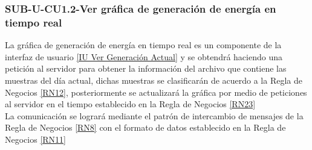 \subsubsection{SUB-U-CU1.2-Ver gráfica de generación de energía en tiempo real}\label{SUB-U-CU1.2}
La gráfica de generación de energía en tiempo real es un componente de la interfaz de usuario \hyperref[fig:monitoreoReal]{[IU Ver Generación Actual]} y se obtendrá haciendo una petición al servidor para obtener la información del archivo que contiene las muestras del día actual, dichas muestras se clasificarán de acuerdo a la Regla de Negocios \ref{RN12}, posteriormente se actualizará la gráfica por medio de peticiones al servidor en el tiempo establecido en la Regla de Negocios \ref{RN23}
\\ 
La comunicación se logrará mediante el patrón de intercambio de mensajes de la Regla de Negocios \ref{RN8} con el formato de datos establecido en la Regla de Negocios \ref{RN11}  

